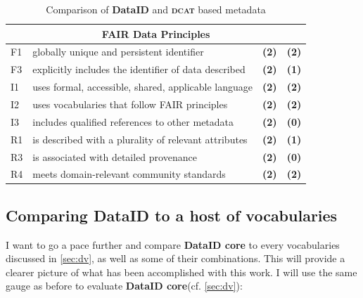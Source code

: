 \documentclass[a4paper,english,twoside,BCOR1.5cm,headsepline,DIV12,appendixprefix,final,12pt]{scrbook}
\newcommand{\dataid}{{\ttfamily\bfseries DataID}\xspace}
\newcommand{\core}{{\ttfamily\bfseries DataID core}\xspace}
\newcommand{\dcat}{{\scshape\bfseries dcat}\xspace}
\begin{document}
\begin{table}[!htbp]
\begin{tabular}{l|l|l|l}
        \hline
        \multicolumn{4}{c}{\textbf{FAIR Data Principles}} \\
        \hline
        F1 & globally unique and persistent identifier & \textbf{\color{ForestGreen}(2)} & \textbf{\color{ForestGreen}(2)}\\
        F3 & explicitly includes the identifier of data described & \textbf{\color{ForestGreen}(2)} & \textbf{\color{BurntOrange}(1)}\\
        I1 & uses formal, accessible, shared, applicable language & \textbf{\color{ForestGreen}(2)} & \textbf{\color{ForestGreen}(2)}\\
        I2 & uses vocabularies that follow FAIR principles & \textbf{\color{ForestGreen}(2)} & \textbf{\color{ForestGreen}(2)}\\
        I3 & includes qualified references to other metadata & \textbf{\color{ForestGreen}(2)} & \textbf{\color{Mahogany}(0)}\\
        R1 & is described with a plurality of relevant attributes & \textbf{\color{ForestGreen}(2)} & \textbf{\color{BurntOrange}(1)}\\
        R3 & is associated with detailed provenance & \textbf{\color{ForestGreen}(2)} & \textbf{\color{Mahogany}(0)}\\
        R4 & meets domain-relevant community standards & \textbf{\color{ForestGreen}(2)} & \textbf{\color{ForestGreen}(2)}
    \end{tabular}
    \caption{Comparison of \dataid and \dcat based metadata}
    \label{tab:evaldataid}
\end{table}

\subsection{Comparing DataID to a host of vocabularies}
\label{sec:evalvocabularies}

I want to go a pace further and compare \core to every vocabularies discussed in \cref{sec:dv}, as well as some of their combinations. This will provide a clearer picture of what has been accomplished with this work. I will use the same gauge as before to evaluate \core (cf. \cref{sec:dv}):
\end{document}
